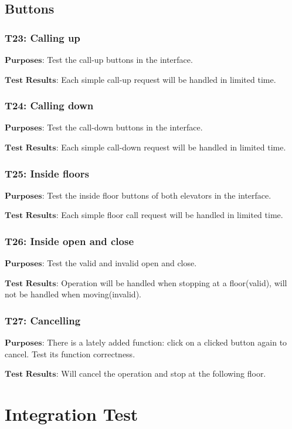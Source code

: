 \documentclass{article}
\begin{document}
\subsection*{Buttons}
\subsubsection*{T23: Calling up}
$\textbf{Purposes:}$ Test the call-up buttons in the interface.

$\textbf{Test Results:}$ Each simple call-up request will be handled in limited time.

\subsubsection*{T24: Calling down}
$\textbf{Purposes:}$ Test the call-down buttons in the interface.

$\textbf{Test Results:}$ Each simple call-down request will be handled in limited time.

\subsubsection*{T25: Inside floors}
$\textbf{Purposes:}$ Test the inside floor buttons of both elevators in the interface.

$\textbf{Test Results:}$ Each simple floor call request will be handled in limited time.

\subsubsection*{T26: Inside open and close}
$\textbf{Purposes:}$ Test the valid and invalid open and close.

$\textbf{Test Results:}$ Operation will be handled when stopping at a floor(valid), will not be handled when moving(invalid).

\subsubsection*{T27: Cancelling}
$\textbf{Purposes:}$ There is a lately added function: click on a clicked button again to cancel. Test its function correctness.

$\textbf{Test Results:}$ Will cancel the operation and stop at the following floor.

\newpage
\section{Integration Test}
\end{document}
